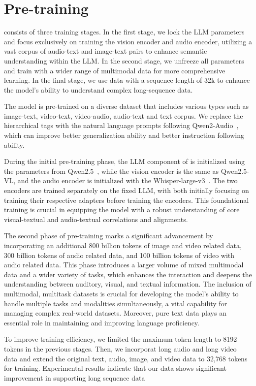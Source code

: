 \section{Pre-training}
\method consists of three training stages. In the first stage, we lock the LLM parameters and focus exclusively on training the vision encoder and audio encoder, utilizing a vast corpus of audio-text and image-text pairs to enhance semantic understanding within the LLM. In the second stage, we unfreeze all parameters and train with a wider range of multimodal data for more comprehensive learning. In the final stage, we use data with a sequence length of 32k to enhance the model's ability to understand complex long-sequence data.

The model is pre-trained on a diverse dataset that includes various types such as image-text, video-text, video-audio, audio-text and text corpus. We replace the hierarchical tags with the natural language prompts following Qwen2-Audio~\citep{qwen2audio}, which can improve better generalization ability and better instruction following ability.

During the initial pre-training phase, the LLM component of \method is initialized using the parameters from Qwen2.5~\citep{qwen2.5}, while the vision encoder is the same as Qwen2.5-VL, and the audio encoder is initialized with the Whisper-large-v3~\citep{Whisper}. The two encoders are trained separately on the fixed LLM, with both initially focusing on training their respective adapters before training the encoders. This foundational training is crucial in equipping the model with a robust understanding of core visual-textual and audio-textual correlations and alignments.

The second phase of pre-training marks a significant advancement by incorporating an additional 800 billion tokens of image and video related data, 300 billion tokens of audio related data, and 100 billion tokens of video with audio related data. This phase introduces a larger volume of mixed multimodal data and a wider variety of tasks, which enhances the interaction and deepens the understanding between auditory, visual, and textual information. The inclusion of multimodal, multitask datasets is crucial for developing the model's ability to handle multiple tasks and modalities simultaneously, a vital capability for managing complex real-world datasets. Moreover, pure text data plays an essential role in maintaining and improving language proficiency.

To improve training efficiency, we limited the maximum token length to 8192 tokens in the previous stages. Then, we incorporat long audio and long video data and extend the original text, audio, image, and video  data to 32,768 tokens for training. Experimental results indicate that our data shows significant improvement in supporting long sequence data


